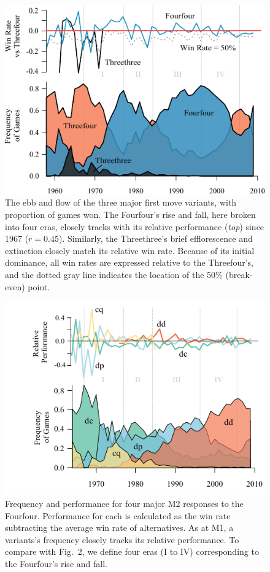 \documentclass{article}
\begin{document}
\begin{figure}[h!]
\begin{center} 
\includegraphics[scale=1.2]{../inputs/figM1FreqsWins.pdf}
\caption{The ebb and flow of the three major first move variants, with proportion of games won.  The Fourfour's rise and fall, here broken into four eras, closely tracks with its relative performance (\textit{top}) since 1967 ($r=0.45$).  Similarly, the Threethree's brief efflorescence and extinction closely match its relative win rate.  Because of its initial dominance, all win rates are expressed relative to the Threefour's, and the dotted gray line indicates the location of the 50\% (break-even) point.}
\label{FigM1FreqsWins}
\end{center}
\end{figure}

\begin{figure}[h!]
\begin{center} 
\includegraphics[scale=1.2]{../inputs/figM2FreqsWins.pdf}
\caption{Frequency and performance for four major M2 responses to the Fourfour.  Performance for each is calculated as the win rate subtracting the average win rate of alternatives.  As at M1, a variants's frequency closely tracks its relative performance.  To compare with Fig.~2, we define four eras (I to IV) corresponding to the Fourfour's rise and fall.}
\label{FigM2FreqsWins}
\end{center}
\end{figure}
\end{document}
